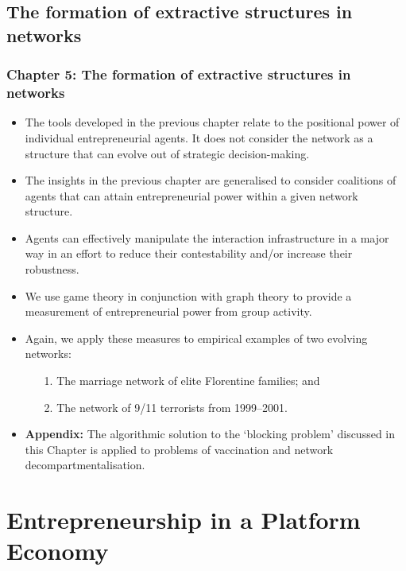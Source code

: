 \documentclass[10pt]{beamer}
\begin{document}
\subsection{The formation of extractive structures in networks}

\begin{frame} \frametitle{Chapter 5: The formation of extractive structures in networks}
\begin{itemize}
\item The tools developed in the previous chapter relate to the positional power of individual entrepreneurial agents. It does not consider the network as a structure that can evolve out of strategic decision-making.
\medskip
\item The insights in the previous chapter are generalised to consider coalitions of agents that can attain entrepreneurial power within a given network structure.
\medskip
\item Agents can effectively manipulate the interaction infrastructure in a major way in an effort to reduce their contestability and/or increase their robustness.
\medskip
\item We use game theory in conjunction with graph theory to provide a measurement of entrepreneurial power from group activity.
\end{itemize}
\end{frame}


\begin{frame}
\begin{itemize}
\item Again, we apply these measures to empirical examples of two evolving networks:
\begin{itemize}
\medskip
\item[1.] The marriage network of elite Florentine families; and
\medskip
\item[2.] The network of 9/11 terrorists from 1999--2001.
\end{itemize}
\medskip
\item \textbf{Appendix:} The algorithmic solution to the `blocking problem' discussed in this Chapter is applied to problems of vaccination and network decompartmentalisation.
\end{itemize}
\end{frame}

\section{Entrepreneurship in a Platform Economy}
\end{document}
